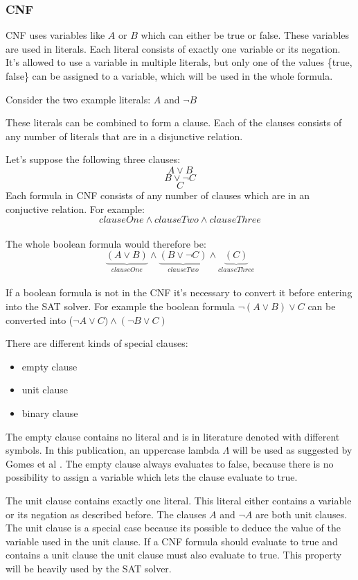\subsubsection{CNF}
CNF uses variables like $A$ or $B$ which can either be true or false.
These variables are used in literals. Each literal consists of exactly one variable or its negation. It's allowed to use a variable in multiple literals, but only one of the values \{true, false\} can be assigned to a variable, which will be used in the whole formula.

Consider the two example literals: $A$ and $\lnot B$

These literals can be combined to form a clause. Each of the clauses consists of any number of literals that are in a disjunctive relation. 

Let's suppose the following three clauses: 
$$A \lor B$$
$$B \lor \lnot C$$ 
$$C$$
Each formula in CNF consists of any number of clauses which are in an conjuctive relation. For example: $$clauseOne \land clauseTwo \land clauseThree$$\\
The whole boolean formula would therefore be: $$\underbrace{(A \lor B)}_{clauseOne} \land \underbrace{(B \lor \lnot C)}_{clauseTwo} \land \underbrace{(C)}_{clauseThree}$$\\

If a boolean formula is not in the CNF it's necessary to convert it before entering into the SAT solver. For example the boolean formula $\lnot(A \lor B) \lor C$ can be converted into ($\lnot A \lor C) \land (\lnot B \lor C)$

There are different kinds of special clauses:
\begin{itemize}
\item empty clause
\item unit clause
\item binary clause
\end{itemize}
The empty clause contains no literal and is in literature denoted with different symbols. In this publication, an uppercase lambda $\Lambda$ will be used as suggested by Gomes et al \cite{Gomes2008SatisfiabilityS}.
The empty clause always evaluates to false, because there is no possibility to assign a variable which lets the clause evaluate to true.

The unit clause contains exactly one literal. This literal either contains a variable or its negation as described before. 
The clauses $A$ and $\lnot A$ are both unit clauses. 
The unit clause is a special case because its possible to deduce the value of the variable used in the unit clause.
If a CNF formula should evaluate to true and contains a unit clause the unit clause must also evaluate to true. 
This property will be heavily used by the SAT solver.

